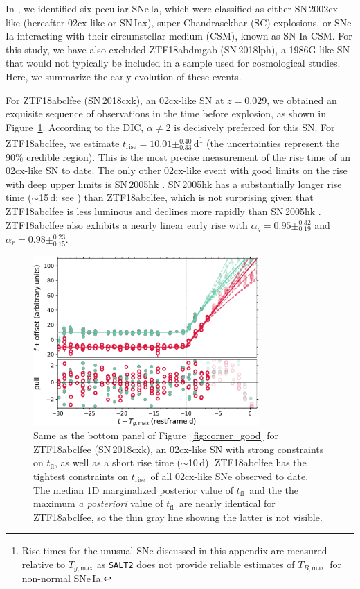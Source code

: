 \documentclass[twocolumn]{./aastex63}
\newcommand{\tfl}{$t_\mathrm{fl}$}
\newcommand{\trise}{$t_\mathrm{rise}$}
\newcommand{\tbmax}{$T_{B,\mathrm{max}}$}
\begin{document}
In \citet{Yao19}, we identified six peculiar SNe\,Ia, which were
classified as either SN\,2002cx-like (hereafter 02cx-like or SN\,Iax),
super-Chandrasekhar (SC) explosions, or SNe\,Ia interacting with their
circumstellar medium (CSM), known as SN Ia-CSM. For this study, we have also
excluded ZTF18abdmgab (SN\,2018lph), a 1986G-like SN that would not typically
be included in a sample used for cosmological studies. Here, we summarize the
early evolution of these events.

For ZTF18abclfee (SN\,2018cxk), an 02cx-like SN at $z = 0.029$, we
obtained an exquisite sequence of observations in the time before explosion,
as shown in Figure~\ref{fig:02cx}. According to the DIC, $\alpha \ne 2$ is
decisively preferred for this SN. For ZTF18abclfee, we estimate \trise$ =
10.01 \pm^{0.40}_{0.33}$\,d\footnote{Rise times for the unusual SNe discussed
in this appendix are measured relative to $T_{g,\mathrm{max}}$ as
\texttt{SALT2} does not provide reliable estimates of \tbmax\ for non-normal
SNe\,Ia.} (the uncertainties represent the 90\% credible region). This is the
most precise measurement of the rise time of an 02cx-like SN to date. The only
other 02cx-like event with good limits on the rise with deep upper limits is
SN\,2005hk \citep{Phillips07}. SN\,2005hk has a substantially longer rise time
($\sim$15\,d; see \citet{Phillips07}) than ZTF18abclfee, which is not
surprising given that ZTF18abclfee is less luminous and declines more rapidly
than SN\,2005hk \citep{Miller17a,Yao19}. ZTF18abclfee also exhibits a nearly
linear early rise with $\alpha_g = 0.95 \pm^{0.32}_{0.19}$ and $\alpha_r =
0.98 \pm^{0.23}_{0.15}$.

\begin{figure}
    \centering
    \includegraphics[width=3.4in]{./figures/ZTF18abclfee_model_lc.pdf}
    \caption{Same as the bottom panel of Figure~\ref{fig:corner_good} for
    ZTF18abclfee (SN\,2018cxk), an 02cx-like SN with strong constraints on
    \tfl, as well as a short rise time ($\sim$10\,d). ZTF18abclfee has the
    tightest constraints on \trise\ of all 02cx-like SNe observed to date. The
    median 1D marginalized posterior value of \tfl\ and the the maximum
    \textit{a posteriori} value of \tfl\ are nearly identical for
    ZTF18abclfee, so the thin gray line showing the latter is not visible.}
    \label{fig:02cx}
\end{figure}
\end{document}
